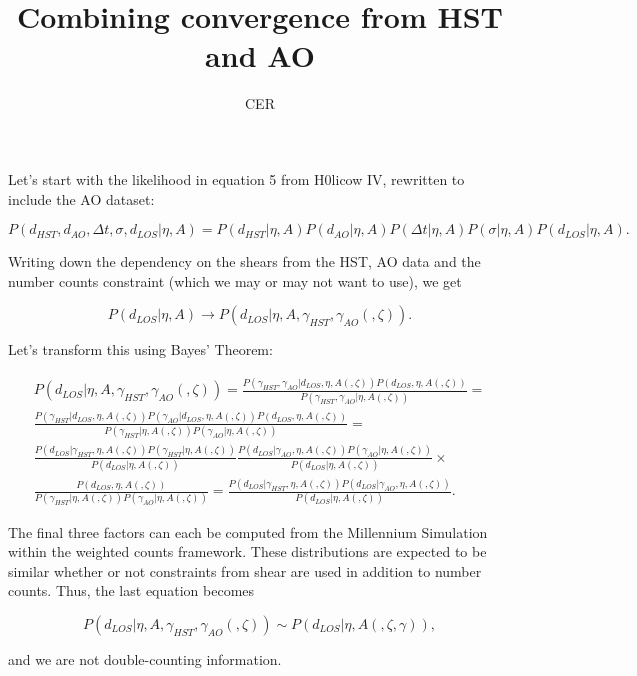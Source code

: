 \documentclass[12pt]{amsart}
\title{Combining convergence from HST and AO}
\author{CER}
\date{} %
\begin{document}
\maketitle

Let's start with the likelihood in equation 5 from H0licow IV, rewritten to include the AO dataset:

\begin{equation}
P(d_{HST},d_{AO},\Delta t,\sigma,d_{LOS}|\eta,A) = P(d_{HST}|\eta,A)P(d_{AO}|\eta,A)P(\Delta t|\eta,A)P(\sigma |\eta,A)P(d_{LOS}|\eta,A).
\end{equation}

Writing down the dependency on the shears from the HST, AO data and the number counts constraint (which we may or may not want to use), we get 

\begin{equation}
P(d_{LOS}|\eta,A) \to P(d_{LOS}|\eta,A,\gamma_{HST},\gamma_{AO}(,\zeta)).
\end{equation}

Let's transform this using Bayes' Theorem:

\begin{multline}
P(d_{LOS}|\eta,A,\gamma_{HST},\gamma_{AO}(,\zeta)) = \frac{P(\gamma_{HST},\gamma_{AO} | d_{LOS},\eta,A(,\zeta)) P(d_{LOS},\eta,A(,\zeta))}{P(\gamma_{HST},\gamma_{AO} | \eta,A(,\zeta))} = \\ \frac{P(\gamma_{HST}| d_{LOS},\eta,A(,\zeta)) P(\gamma_{AO} | d_{LOS},\eta,A(,\zeta)) P(d_{LOS},\eta,A(,\zeta))}{P(\gamma_{HST} | \eta,A(,\zeta)) P(\gamma_{AO} | \eta,A(,\zeta))} = \\ \frac{P(d_{LOS} | \gamma_{HST},\eta,A(,\zeta)) P(\gamma_{HST} | \eta,A(,\zeta))}{P(d_{LOS}|\eta,A(,\zeta))} \frac{P(d_{LOS} | \gamma_{AO},\eta,A(,\zeta)) P(\gamma_{AO} | \eta,A(,\zeta))}{P(d_{LOS}|\eta,A(,\zeta))} \times \\ \frac{P(d_{LOS},\eta,A(,\zeta))}{P(\gamma_{HST} | \eta,A(,\zeta)) P(\gamma_{AO} | \eta,A(,\zeta))} = \frac{P(d_{LOS} | \gamma_{HST},\eta,A(,\zeta)) P(d_{LOS} | \gamma_{AO},\eta,A(,\zeta))}{P(d_{LOS}|\eta,A(,\zeta))}.
\end{multline}

The final three factors can each be computed from the Millennium Simulation within the weighted counts framework. These distributions are expected to be similar whether or not constraints from shear are used in addition to number counts. Thus, the last equation becomes 

\begin{equation}
P(d_{LOS}|\eta,A,\gamma_{HST},\gamma_{AO}(,\zeta)) \sim P(d_{LOS}|\eta,A(,\zeta,\gamma)),
\end{equation}

\noindent and we are not double-counting information.

\end{document}
